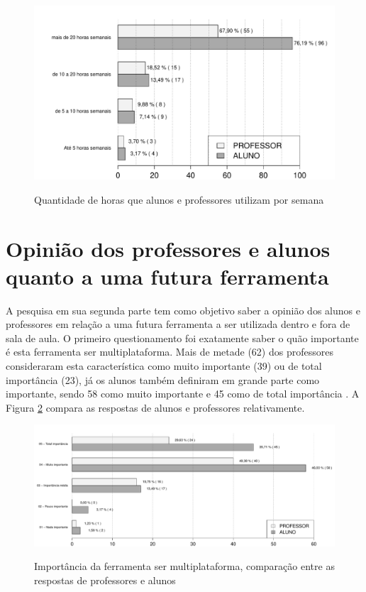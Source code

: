 \begin{figure}[!h]
\centering
\caption{Quantidade de horas que alunos e professores utilizam por semana}
\includegraphics[width=1.0\textwidth]{pdfs/alunos-professores/uso-internet.pdf} 
\label{fig:grafico_uso_internet} 
\end{figure}



\section{Opinião dos professores e alunos quanto a uma futura ferramenta}

A pesquisa em sua segunda parte tem como objetivo saber a opinião dos alunos e professores em relação a uma futura ferramenta a ser utilizada dentro e fora de sala de aula. O primeiro questionamento foi exatamente saber o quão importante é esta ferramenta ser multiplataforma. Mais de metade (62) dos professores consideraram esta característica como muito importante (39) ou de total importância (23), já os alunos também definiram em grande parte como importante, sendo 58 como muito importante e 45 como de total importância . A Figura \ref{fig:grafico_multiplataforma} compara as respostas de alunos e professores relativamente. 

\begin{figure}[!h]
\centering
\caption{Importância da ferramenta ser multiplataforma, comparação entre as respostas de professores e alunos}
\includegraphics[width=1.0\textwidth]{pdfs/alunos-professores/funcionalidades-multiplataforma2.pdf} 
\label{fig:grafico_multiplataforma} 
\end{figure}

